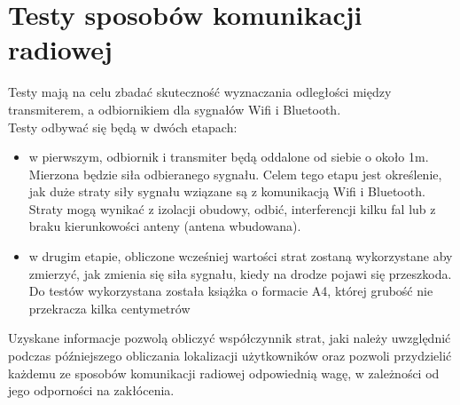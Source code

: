 \chapter{Testy sposobów komunikacji radiowej}
\label{cha:teoria}

Testy mają na celu zbadać skuteczność wyznaczania odległości między transmiterem, a odbiornikiem dla sygnałów Wifi i Bluetooth.\\
Testy odbywać się będą w dwóch etapach:
\begin{itemize}
	\item w pierwszym, odbiornik i transmiter będą oddalone od siebie o około 1m. Mierzona będzie siła odbieranego sygnału. Celem tego etapu jest określenie, jak duże straty siły sygnału wziązane są z komunikacją Wifi i Bluetooth. Straty mogą wynikać z izolacji obudowy, odbić, interferencji kilku fal lub z braku kierunkowości anteny (antena wbudowana).
	\item w drugim etapie, obliczone wcześniej wartości strat zostaną wykorzystane aby zmierzyć, jak zmienia się siła sygnału, kiedy na drodze pojawi się przeszkoda. Do testów wykorzystana została książka o formacie A4, której grubość nie przekracza kilka centymetrów
\end{itemize}
Uzyskane informacje pozwolą obliczyć współczynnik strat, jaki należy uwzględnić podczas późniejszego obliczania lokalizacji użytkowników oraz pozwoli przydzielić każdemu ze sposobów komunikacji radiowej odpowiednią wagę, w zależności od jego odporności na zakłócenia.
